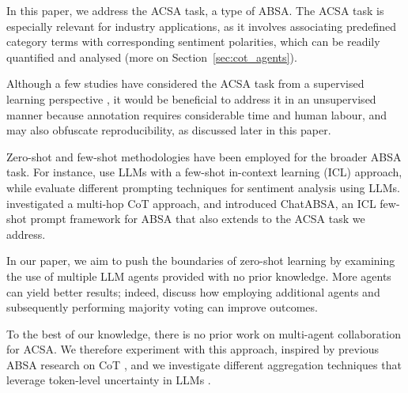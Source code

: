 \documentclass[11pt]{article}
\begin{document}
In this paper, we address the ACSA task, a type of ABSA. The ACSA task is especially relevant for industry applications, as it involves associating predefined category terms with corresponding sentiment polarities, which can be readily quantified and analysed (more on Section~\ref{sec:cot_agents}).

Although a few studies have considered the ACSA task from a supervised learning perspective \citep{cai-etal-2020-aspect,PING2024126994,Xu2025}, it would be beneficial to address it in an unsupervised manner because annotation requires considerable time and human labour, and may also obfuscate reproducibility, as discussed later in this paper.

Zero-shot and few-shot methodologies have been employed for the broader ABSA task. For instance, \citet{Hellwig2025DoWS} use LLMs with a few-shot in-context learning (ICL) approach, while \citet{10499502} evaluate different prompting techniques for sentiment analysis using LLMs. \citet{fei-etal-2023-reasoning} investigated a multi-hop CoT approach, and \citet{bai-etal-2024-compound} introduced ChatABSA, an ICL few-shot prompt framework for ABSA that also extends to the ACSA task we address.

In our paper, we aim to push the boundaries of zero-shot learning by examining the use of multiple LLM agents provided with no prior knowledge. More agents can yield better results; indeed, \citet{li2024agentsneed} discuss how employing additional agents and subsequently performing majority voting can improve outcomes.

To the best of our knowledge, there is no prior work on multi-agent collaboration for ACSA. We therefore experiment with this approach, inspired by previous ABSA research on CoT \citep{fei-etal-2023-reasoning,10499502}, and we investigate different aggregation techniques that leverage token-level uncertainty in LLMs \citep{shorinwa2024surveyuncertaintyquantificationlarge}. 




\end{document}
